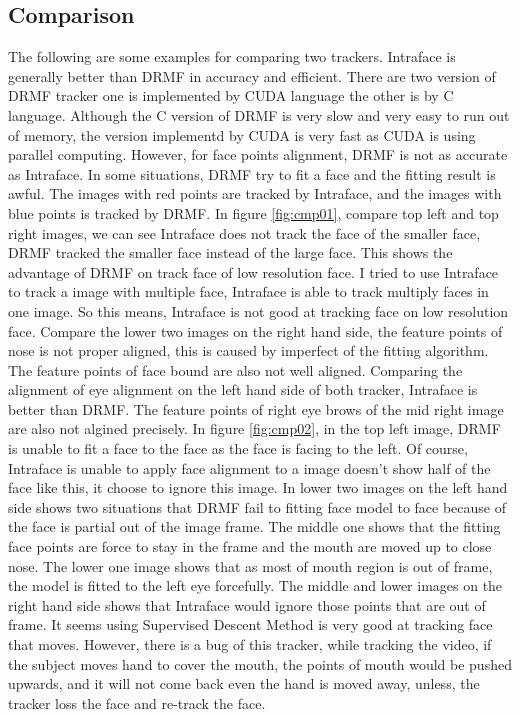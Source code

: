 \subsection{Comparison}
The following are some examples for comparing two trackers. Intraface is generally better than DRMF in accuracy and efficient. There are two version of DRMF tracker one is implemented by CUDA language the other is by C language. Although the C version of DRMF is very slow and very easy to run out of memory, the version implementd by CUDA is very fast as CUDA is using parallel computing. However, for face points alignment, DRMF is not as accurate as Intraface. In some situations, DRMF try to fit a face and the fitting result is awful. The images with red points are tracked by Intraface, and the images with blue points is tracked by DRMF.
\newline
In figure \ref{fig:cmp01}, compare top left and top right images, we can see Intraface does not track the face of the smaller face, DRMF tracked the smaller face instead of the large face. This shows the advantage of DRMF on track face of low resolution face. I tried to use Intraface to track a image with multiple face, Intraface is able to track multiply faces in one image. So this means, Intraface is not good at tracking face on low resolution face. Compare the lower two images on the right hand side, the feature points of nose is not proper aligned, this is caused by imperfect of the fitting algorithm. The feature points of face bound are also not well aligned. Comparing the alignment of eye alignment on the left hand side of both tracker, Intraface is better than DRMF. The feature points of right eye brows of the mid right image are also not algined precisely.
\newline
In figure \ref{fig:cmp02}, in the top left image, DRMF is unable to fit a face to the face as the face is facing to the left. Of course, Intraface is unable to apply face alignment to a image doesn't show half of the face like this, it choose to ignore this image. In lower two images on the left hand side shows two situations that DRMF fail to fitting face model to face because of the face is partial out of the image frame. The middle one shows that the fitting face points are force to stay in the frame and the mouth are moved up to close nose. The lower one image shows that as most of mouth region is out of frame, the model is fitted to the left eye forcefully. The middle and lower images on the right hand side shows that Intraface would ignore those points that are out of frame. It seems using Supervised Descent Method is very good at tracking face that moves. However, there is a bug of this tracker, while tracking the video, if the subject moves hand to cover the mouth, the points of mouth would be pushed upwards, and it will not come back even the hand is moved away, unless, the tracker loss the face and re-track the face.
